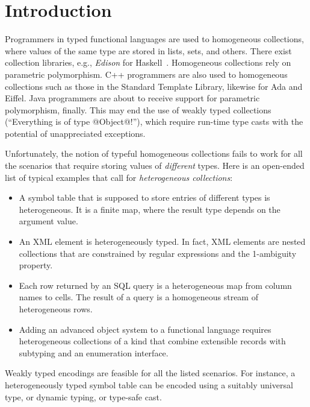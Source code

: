 \documentclass[nocopyrightspace,preprint]{sigplan-proc}
\begin{document}
\pagestyle{plain}

\makeatactive






\section{Introduction}
 
Programmers in typed functional languages are used to homogeneous
collections, where values of the same type are stored in lists, sets,
and others. There exist collection libraries, e.g., \emph{Edison} for
Haskell~\cite{Edison}. Homogeneous collections rely on parametric
polymorphism. C++ programmers are also used to homogeneous collections
such as those in the Standard Template Library, likewise for Ada and
Eiffel. Java programmers are about to receive support for parametric
polymorphism, finally. This may end the use of weakly typed
collections (``Everything is of type @Object@!''), which require
run-time type casts with the potential of unappreciated exceptions.

Unfortunately, the notion of typeful homogeneous collections fails to
work for all the scenarios that require storing values of
\emph{different} types. Here is an open-ended list of typical examples
that call for \emph{heterogeneous collections}:
%
\begin{itemize}
%
\item A symbol table that is supposed to store entries of different
types is heterogeneous. It is a finite map, where the result type
depends on the argument value.
%
\item An XML element is heterogeneously typed. In fact, XML elements
are nested collections that are constrained by regular expressions and
the 1-ambiguity property.
%
\item Each row returned by an SQL query is a heterogeneous map from
column names to cells. The result of a query is a homogeneous stream
of heterogeneous rows.
%
\item Adding an advanced object system to a functional language
requires heterogeneous collections of a kind that combine extensible
records with subtyping and an enumeration interface.
%
\end{itemize}
%
Weakly typed encodings are feasible for all the listed scenarios. For
instance, a heterogeneously typed symbol table can be encoded using a
suitably universal type, or dynamic typing, or type-safe cast.
\end{document}
